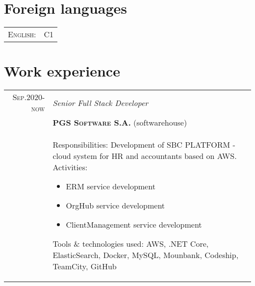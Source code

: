 \documentclass[a4paper,12pt]{article}
\begin{document}
\vspace{2em}

\section{Foreign languages}
\begin{tabular}{r|p{11cm}}
	\textsc{English:}&C1\\
\end{tabular}

\vspace{2em}


\section{Work experience}
\begin{tabular}{r|p{12cm}}
\textsc{Sep.2020-now}
	&\emph{Senior Full Stack Developer}\\
	&\textsc{\textbf{PGS Software S.A.}}  (softwarehouse)\\ 
	&\footnotesize{
		Responsibilities: Development of SBC PLATFORM - cloud system for HR and accountants based on AWS.\newline
		Activities:
		\begin{itemize}
			\item ERM service development
			\item OrgHub service development
			\item ClientManagement service development
		\end{itemize}
		Tools \& technologies used: \newline
		AWS, .NET Core, ElasticSearch, Docker, MySQL, Mounbank, Codeship, TeamCity, GitHub
	}
	\multicolumn{2}{c}{}
\end{tabular}
\end{document}
